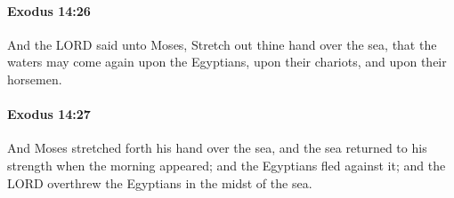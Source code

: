		\paragraph{Exodus 14:26} %
			\label{EXODUS-14-26}

			And the LORD said unto Moses, Stretch out thine hand over the sea, that the waters may come again upon the Egyptians, upon their chariots, and upon their horsemen.


		\paragraph{Exodus 14:27} %
			\label{EXODUS-14-27}

			And Moses stretched forth his hand over the sea, and the sea returned to his strength when the morning appeared; and the Egyptians fled against it; and the LORD overthrew the Egyptians in the midst of the sea.

